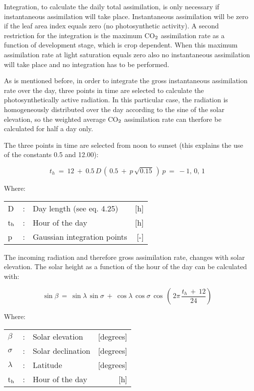 Integration, to calculate the daily total assimilation, is only necessary if instanta\-neous
assimilation will take place. Instanta\-neous assimila\-tion will be zero if the leaf area index
equals zero (no photosynthetic activity). A second restriction for the integration is the
maximum CO$_{{\rm 2}}$ assimilation rate as a function of development stage, which is crop
dependent. When this maxi\-mum assimila\-tion rate at light saturation equals zero also no
instantaneous assimila\-tion will take place and no integration has to be performed.

As is mentioned before, in order to integrate the gross instantaneous assimilation rate
over the day, three points in time are selected to calculate the photosynthetically active
radiation. In this particular case, the radiation is homogeneously distributed over the day
according to the sine of the solar elevation, so the weighted average CO$_{{\rm 2}}$ assimilation rate
can therfore be calculated for half a day only.

The three points in time are selected from noon to sunset (this explains the use of the
constants 0.5 and 12.00):

\begin{equation}
t _{h} ~=~ 12 ~+~ 0.5\, D\, (\, 0.5 ~+~ p\, \sqrt{0.15} \, ) ~p~=~-1,\, 0,\, 1
\end{equation}

Where:\\
\begin{tabularx}{\textwidth}{llXr}
D &:& Day length (see eq. 4.25)    &    [h]\\
t$_{{\rm h}}$ &:& Hour of the day  &      [h]\\
p &:& Gaussian integration points  &      [-]\\
\end{tabularx}

The incoming radiation and therefore gross assimilation rate, changes with solar eleva\-tion. The solar height as a function of the hour of the day can be calculated with:

\begin{equation}
\sin \beta ~=~ \sin \lambda \, \sin \sigma ~+~ \cos \lambda \, \cos \sigma \, \cos \, (\, 2 \pi \,{\frac{t _{h} ~+~ 12}{24}} )
\end{equation}


Where:\\
\begin{tabularx}{\textwidth}{llXr}
$\beta$ &:& Solar elevation   &    [degrees]\\
$\sigma$ &:& Solar declination    &    [degrees]\\
$\lambda$ &:& Latitude     &   [degrees]\\
t$_{{\rm h}}$ &:& Hour of the day    &    [h]\\
\end{tabularx}

